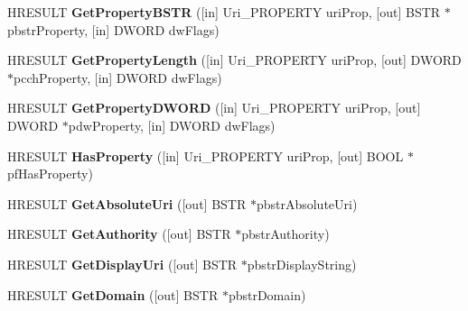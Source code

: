 \begin{DoxyCompactItemize}
\item 
\mbox{\label{interface_i_uri_a07191eb7429f48cfff0b73dd05c14a8c}} 
H\+R\+E\+S\+U\+LT {\bfseries Get\+Property\+B\+S\+TR} (\mbox{[}in\mbox{]} Uri\+\_\+\+P\+R\+O\+P\+E\+R\+TY uri\+Prop, \mbox{[}out\mbox{]} B\+S\+TR $\ast$pbstr\+Property, \mbox{[}in\mbox{]} D\+W\+O\+RD dw\+Flags)
\item 
\mbox{\label{interface_i_uri_ab3d10af9e532a4bf0856035c5387fa42}} 
H\+R\+E\+S\+U\+LT {\bfseries Get\+Property\+Length} (\mbox{[}in\mbox{]} Uri\+\_\+\+P\+R\+O\+P\+E\+R\+TY uri\+Prop, \mbox{[}out\mbox{]} D\+W\+O\+RD $\ast$pcch\+Property, \mbox{[}in\mbox{]} D\+W\+O\+RD dw\+Flags)
\item 
\mbox{\label{interface_i_uri_a8bca3cc9d1429cf3170ca2bb2b392278}} 
H\+R\+E\+S\+U\+LT {\bfseries Get\+Property\+D\+W\+O\+RD} (\mbox{[}in\mbox{]} Uri\+\_\+\+P\+R\+O\+P\+E\+R\+TY uri\+Prop, \mbox{[}out\mbox{]} D\+W\+O\+RD $\ast$pdw\+Property, \mbox{[}in\mbox{]} D\+W\+O\+RD dw\+Flags)
\item 
\mbox{\label{interface_i_uri_a80dd674341b7701407d8e38d62fee87c}} 
H\+R\+E\+S\+U\+LT {\bfseries Has\+Property} (\mbox{[}in\mbox{]} Uri\+\_\+\+P\+R\+O\+P\+E\+R\+TY uri\+Prop, \mbox{[}out\mbox{]} B\+O\+OL $\ast$pf\+Has\+Property)
\item 
\mbox{\label{interface_i_uri_a225f5c924bb2cb1d7c191be8b29046eb}} 
H\+R\+E\+S\+U\+LT {\bfseries Get\+Absolute\+Uri} (\mbox{[}out\mbox{]} B\+S\+TR $\ast$pbstr\+Absolute\+Uri)
\item 
\mbox{\label{interface_i_uri_a49d4429ca25d2f119e2a3322c4712645}} 
H\+R\+E\+S\+U\+LT {\bfseries Get\+Authority} (\mbox{[}out\mbox{]} B\+S\+TR $\ast$pbstr\+Authority)
\item 
\mbox{\label{interface_i_uri_ab065270f80aec9ae7d580e1c959ab3b6}} 
H\+R\+E\+S\+U\+LT {\bfseries Get\+Display\+Uri} (\mbox{[}out\mbox{]} B\+S\+TR $\ast$pbstr\+Display\+String)
\item 
\mbox{\label{interface_i_uri_a5bc59d6bdd940521777d804a9222030d}} 
H\+R\+E\+S\+U\+LT {\bfseries Get\+Domain} (\mbox{[}out\mbox{]} B\+S\+TR $\ast$pbstr\+Domain)

\end{DoxyCompactItemize}
